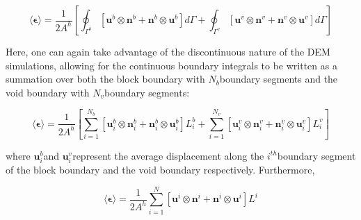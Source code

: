 \begin{equation}
\langle\boldsymbol{\epsilon}\rangle=\frac{1}{2A^{h}}\left[\oint_{\Gamma^{b}}\left[\mathbf{u}^{b}\otimes\mathbf{n}^{b}+\mathbf{n}^{b}\otimes\mathbf{u}^{b}\right]d\Gamma+\oint_{\Gamma^{v}}\left[\mathbf{u}^{v}\otimes\mathbf{n}^{v}+\mathbf{n}^{v}\otimes\mathbf{u}^{v}\right]d\Gamma\right]\label{eqn:strain5}
\end{equation}


Here, one can again take advantage of the discontinuous nature of
the DEM simulations, allowing for the continuous boundary integrals
to be written as a summation over both the block boundary with $N_{b}$boundary
segments and the void boundary with $N_{v}$boundary segments:

\begin{equation}
\langle\boldsymbol{\epsilon}\rangle=\frac{1}{2A^{h}}\left[\sum_{i=1}^{N_{b}}\left[\mathbf{u}_{i}^{b}\otimes\mathbf{n}_{i}^{b}+\mathbf{n}_{i}^{b}\otimes\mathbf{u}_{i}^{b}\right]L_{i}^{b}+\sum_{i=1}^{N_{v}}\left[\mathbf{u}_{i}^{v}\otimes\mathbf{n}_{i}^{v}+\mathbf{n}_{i}^{v}\otimes\mathbf{u}_{i}^{v}\right]L_{i}^{v}\right]\label{eqn:strain6}
\end{equation}


where $\mathbf{u}_{i}^{b}$and $\mathbf{u}_{i}^{v}$represent the
average displacement along the $i^{th}$boundary segment of the block
boundary and the void boundary respectively. Furthermore,

\begin{equation}
\langle\boldsymbol{\epsilon}\rangle=\frac{1}{2A^{h}}\sum_{i=1}^{N}\left[\mathbf{u}^{i}\otimes\mathbf{n}^{i}+\mathbf{n}^{i}\otimes\mathbf{u}^{i}\right]L^{i}\label{eqn:strain7}
\end{equation}
